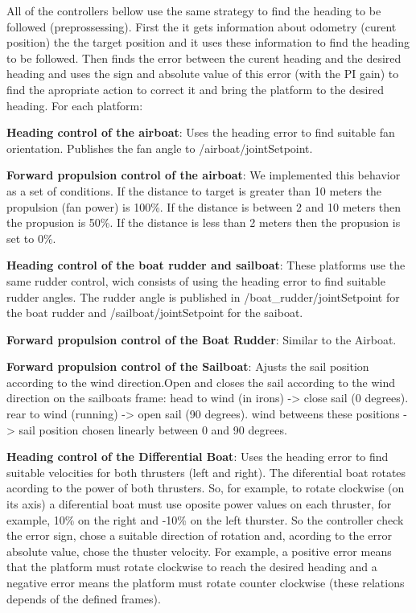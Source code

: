 \documentclass[letterpaper,10pt,english]{sphinxmanual}
\begin{document}
All of the controllers bellow use the same strategy to find the heading to be followed (preprossessing). First the it gets information about odometry (curent position) the the target position and it uses these information to find the heading to be followed. Then finds the error between the curent heading and the desired heading and uses the sign and absolute value of this error (with the PI gain) to find the apropriate action to correct it and bring the platform to the desired heading. For each platform:

\textbf{Heading control of the airboat}: Uses the heading error to find suitable fan orientation. Publishes the fan angle to /airboat/jointSetpoint.

\textbf{Forward propulsion control of the airboat}: We implemented this behavior as a set of conditions. If the distance to target is greater than 10 meters the propulsion (fan power) is 100\%. If the distance is between 2 and 10 meters then the propusion is 50\%. If the distance is less than 2 meters then the propusion is set to 0\%.

\textbf{Heading control of the boat rudder and sailboat}: These platforms use the same rudder control, wich consists of using the heading error to find suitable rudder angles. The rudder angle is published in /boat\_rudder/jointSetpoint for the boat rudder and /sailboat/jointSetpoint for the saiboat.

\textbf{Forward propulsion control of the Boat Rudder}: Similar to the Airboat.

\textbf{Forward propulsion control of the Sailboat}: Ajusts the sail position according to the wind direction.Open and closes the sail according to the wind direction on the sailboats frame: head to wind (in irons) -\textgreater{} close sail (0 degrees). rear to wind (running) -\textgreater{} open sail (90 degrees). wind betweens these positions -\textgreater{} sail position chosen linearly between 0 and 90 degrees.

\textbf{Heading control of the Differential Boat}: Uses the heading error to find suitable velocities for both thrusters (left and right). The diferential boat rotates acording to the power of both thrusters. So, for example, to rotate clockwise (on its axis) a diferential boat must use oposite power values on each thruster, for example, 10\% on the right and -10\% on the left thurster. So the controller check the error sign, chose a suitable direction of rotation and, acording to the error absolute value, chose the thuster velocity.  For example, a positive error means that the platform must rotate clockwise to reach the desired heading and a negative error means the platform must rotate counter clockwise (these relations depends of the defined frames).
\end{document}

